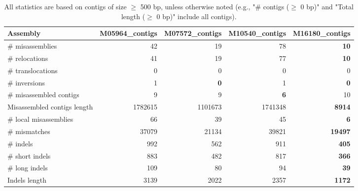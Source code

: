 \documentclass[12pt,a4paper]{article}
\begin{document}
\begin{table}[ht]
\begin{center}
\caption{All statistics are based on contigs of size $\geq$ 500 bp, unless otherwise noted (e.g., "\# contigs ($\geq$ 0 bp)" and "Total length ($\geq$ 0 bp)" include all contigs).}
\begin{tabular}{|l*{4}{|r}|}
\hline
Assembly & M05964\_contigs & M07572\_contigs & M10540\_contigs & M16180\_contigs \\ \hline
\# misassemblies & 42 & 19 & 78 & {\bf 10} \\ \hline
\hspace{5mm}\# relocations & 41 & 19 & 77 & {\bf 10} \\ \hline
\hspace{5mm}\# translocations & 0 & 0 & 0 & 0 \\ \hline
\hspace{5mm}\# inversions & 1 & {\bf 0} & 1 & {\bf 0} \\ \hline
\# misassembled contigs & 9 & 9 & {\bf 6} & 10 \\ \hline
Misassembled contigs length & 1782615 & 1101673 & 1741348 & {\bf 8914} \\ \hline
\# local misassemblies & 66 & 39 & 45 & {\bf 6} \\ \hline
\# mismatches & 37079 & 21134 & 39821 & {\bf 19497} \\ \hline
\# indels & 992 & 562 & 911 & {\bf 405} \\ \hline
\hspace{5mm}\# short indels & 883 & 482 & 817 & {\bf 366} \\ \hline
\hspace{5mm}\# long indels & 109 & 80 & 94 & {\bf 39} \\ \hline
Indels length & 3139 & 2022 & 2357 & {\bf 1172} \\ \hline
\end{tabular}
\end{center}
\end{table}
\end{document}
